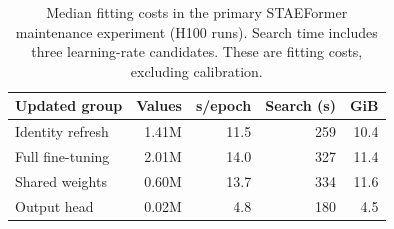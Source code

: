 \begin{table}[htbp]
\centering
\caption{Median fitting costs in the primary STAEFormer maintenance experiment (H100 runs). Search time includes three learning-rate candidates. These are fitting costs, excluding calibration.}
\label{tab:cost}
\begin{tabular}{lrrrr}
\toprule
Updated group & Values & s/epoch & Search (s) & GiB \\
\midrule
Identity refresh & 1.41M & 11.5 & 259 & 10.4 \\
Full fine-tuning & 2.01M & 14.0 & 327 & 11.4 \\
Shared weights & 0.60M & 13.7 & 334 & 11.6 \\
Output head & 0.02M & 4.8 & 180 & 4.5 \\
\bottomrule
\end{tabular}
\end{table}

